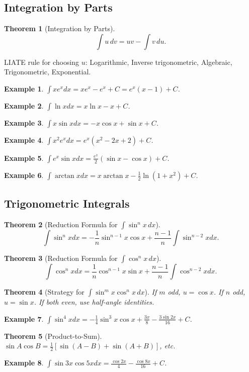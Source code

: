 \documentclass[11pt,a4paper]{article}
\newtheorem{example}{Example}
\newtheorem{theorem}{Theorem}
\begin{document}
\subsection{Integration by Parts}
\begin{theorem}[Integration by Parts]
\[
\int u \, dv = uv - \int v \, du.
\]
\end{theorem}
LIATE rule for choosing $u$: Logarithmic, Inverse trigonometric, Algebraic, Trigonometric, Exponential.
\begin{example}
$\int xe^x dx = xe^x - e^x + C = e^x(x-1) + C$.
\end{example}
\begin{example}
$\int \ln x dx = x\ln x - x + C$.
\end{example}
\begin{example}
$\int x\sin x dx = -x\cos x + \sin x + C$.
\end{example}
\begin{example}
$\int x^2 e^x dx = e^x(x^2 - 2x + 2) + C$.
\end{example}
\begin{example}
$\int e^x \sin x dx = \frac{e^x}{2}(\sin x - \cos x) + C$.
\end{example}
\begin{example}
$\int \arctan x dx = x\arctan x - \frac{1}{2}\ln(1+x^2) + C$.
\end{example}
\subsection{Trigonometric Integrals}
\begin{theorem}[Reduction Formula for $\int \sin^n x \, dx$]
\[
\int \sin^n x dx = -\frac{1}{n}\sin^{n-1}x\cos x + \frac{n-1}{n}\int \sin^{n-2}x dx.
\]
\end{theorem}
\begin{theorem}[Reduction Formula for $\int \cos^n x \, dx$]
\[
\int \cos^n x dx = \frac{1}{n}\cos^{n-1}x\sin x + \frac{n-1}{n}\int \cos^{n-2}x dx.
\]
\end{theorem}
\begin{theorem}[Strategy for $\int \sin^m x \cos^n x \, dx$]
If $m$ odd, $u = \cos x$. If $n$ odd, $u = \sin x$. If both even, use half-angle identities.
\end{theorem}
\begin{example}
$\int \sin^4 x dx = -\frac{1}{4}\sin^3 x\cos x + \frac{3x}{8} - \frac{3\sin 2x}{16} + C$.
\end{example}
\begin{theorem}[Product-to-Sum]
$\sin A \cos B = \frac{1}{2}[\sin(A-B) + \sin(A+B)]$, etc.
\end{theorem}
\begin{example}
$\int \sin 3x \cos 5x dx = \frac{\cos 2x}{4} - \frac{\cos 8x}{16} + C$.
\end{example}
\end{document}
